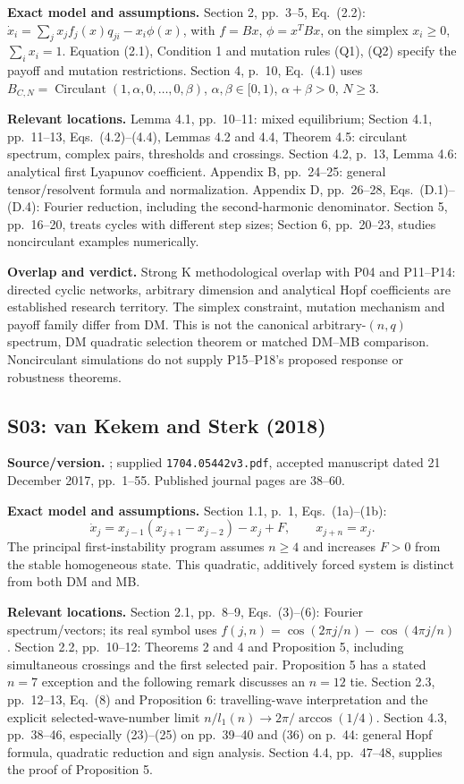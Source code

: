 \textbf{Exact model and assumptions.} Section 2, pp.~3--5, Eq.~(2.2):
$\dot x_i=\sum_j x_j f_j(x)q_{ji}-x_i\phi(x)$, with $f=Bx$,
$\phi=x^TBx$, on the simplex $x_i\geq0$, $\sum_i x_i=1$.
Equation (2.1), Condition 1 and mutation rules (Q1), (Q2) specify the
payoff and mutation restrictions. Section 4, p.~10, Eq.~(4.1) uses
$B_{C,N}=\operatorname{Circulant}(1,\alpha,0,\ldots,0,\beta)$,
$\alpha,\beta\in[0,1)$, $\alpha+\beta>0$, $N\geq3$.

\textbf{Relevant locations.} Lemma 4.1, pp.~10--11: mixed equilibrium;
Section 4.1, pp.~11--13, Eqs.~(4.2)--(4.4), Lemmas 4.2 and 4.4,
Theorem 4.5: circulant spectrum, complex pairs, thresholds and crossings.
Section 4.2, p.~13, Lemma 4.6: analytical first Lyapunov coefficient.
Appendix B, pp.~24--25: general tensor/resolvent formula and normalization.
Appendix D, pp.~26--28, Eqs.~(D.1)--(D.4): Fourier reduction, including
the second-harmonic denominator. Section 5, pp.~16--20, treats cycles
with different step sizes; Section 6, pp.~20--23, studies noncirculant
examples numerically.

\textbf{Overlap and verdict.} Strong K methodological overlap with
P04 and P11--P14: directed cyclic networks, arbitrary dimension and
analytical Hopf coefficients are established research territory. The
simplex constraint, mutation mechanism and payoff family differ from DM.
This is not the canonical arbitrary-$(n,q)$ spectrum, DM quadratic
selection theorem or matched DM--MB comparison. Noncirculant simulations
do not supply P15--P18's proposed response or robustness theorems.

\subsection{S03: van Kekem and Sterk (2018)}
\label{src:vks}
\textbf{Source/version.} \cite{vanKekemSterk2018}; supplied
\texttt{1704.05442v3.pdf}, accepted manuscript dated 21 December 2017,
pp.~1--55. Published journal pages are 38--60.

\textbf{Exact model and assumptions.} Section 1.1, p.~1,
Eqs.~(1a)--(1b):
\[
 \dot x_j=x_{j-1}(x_{j+1}-x_{j-2})-x_j+F,
 \qquad x_{j+n}=x_j.
\]
The principal first-instability program assumes $n\geq4$ and increases
$F>0$ from the stable homogeneous state. This quadratic, additively forced
system is distinct from both DM and MB.

\textbf{Relevant locations.} Section 2.1, pp.~8--9, Eqs.~(3)--(6):
Fourier spectrum/vectors; its real symbol uses
$f(j,n)=\cos(2\pi j/n)-\cos(4\pi j/n)$.
Section 2.2, pp.~10--12: Theorems 2 and 4 and Proposition 5, including
simultaneous crossings and the first selected pair. Proposition 5 has
a stated $n=7$ exception and the following remark discusses an $n=12$
tie. Section 2.3, pp.~12--13, Eq.~(8) and Proposition 6: travelling-wave
interpretation and the explicit selected-wave-number limit
$n/l_1(n)\to2\pi/\arccos(1/4)$.
Section 4.3, pp.~38--46, especially (23)--(25) on pp.~39--40 and
(36) on p.~44: general Hopf formula, quadratic reduction and sign analysis.
Section 4.4, pp.~47--48, supplies the proof of Proposition 5.

